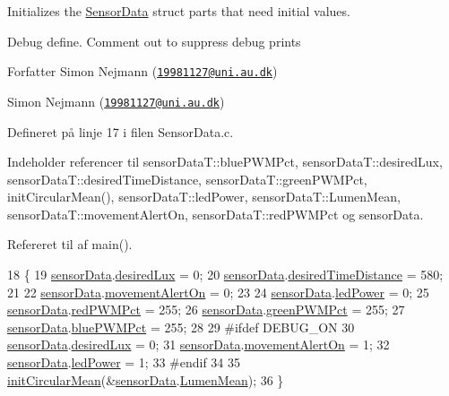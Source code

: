 Initializes the \hyperlink{class_sensor_data}{Sensor\+Data} struct parts that need initial values. 

Debug define. Comment out to suppress debug prints

\begin{DoxyAuthor}{Forfatter}
Simon Nejmann (\href{mailto:19981127@uni.au.dk}{\tt 19981127@uni.\+au.\+dk})

Simon Nejmann (\href{mailto:19981127@uni.au.dk}{\tt 19981127@uni.\+au.\+dk}) 
\end{DoxyAuthor}


Defineret på linje 17 i filen Sensor\+Data.\+c.



Indeholder referencer til sensor\+Data\+T\+::blue\+P\+W\+M\+Pct, sensor\+Data\+T\+::desired\+Lux, sensor\+Data\+T\+::desired\+Time\+Distance, sensor\+Data\+T\+::green\+P\+W\+M\+Pct, init\+Circular\+Mean(), sensor\+Data\+T\+::led\+Power, sensor\+Data\+T\+::\+Lumen\+Mean, sensor\+Data\+T\+::movement\+Alert\+On, sensor\+Data\+T\+::red\+P\+W\+M\+Pct og sensor\+Data.



Refereret til af main().


\begin{DoxyCode}
18 \{
19     \hyperlink{_sensor_data_8h_a166db779eaca1ca69d6d63aa4fc36674}{sensorData}.\hyperlink{_sensor_data_8h_ad85f2cca5ef7520f1dc87fc48fc6d8e6}{desiredLux} = 0;
20     \hyperlink{_sensor_data_8h_a166db779eaca1ca69d6d63aa4fc36674}{sensorData}.\hyperlink{_sensor_data_8h_a477d7465dc8c397bdb795593df890d8b}{desiredTimeDistance} = 580;
21 
22     \hyperlink{_sensor_data_8h_a166db779eaca1ca69d6d63aa4fc36674}{sensorData}.\hyperlink{_sensor_data_8h_a722c0f415211bda0d848dd8edac4f1fe}{movementAlertOn} = 0;
23     
24     \hyperlink{_sensor_data_8h_a166db779eaca1ca69d6d63aa4fc36674}{sensorData}.\hyperlink{_sensor_data_8h_a3fc7bb7b6b9d39b2a6ae384d15fc5b9d}{ledPower} = 0;
25     \hyperlink{_sensor_data_8h_a166db779eaca1ca69d6d63aa4fc36674}{sensorData}.\hyperlink{_sensor_data_8h_a6ac22d5f267938f95b2261ffa3d5e2d2}{redPWMPct} = 255;
26     \hyperlink{_sensor_data_8h_a166db779eaca1ca69d6d63aa4fc36674}{sensorData}.\hyperlink{_sensor_data_8h_ac83b8257127d55e998596d703ff141ac}{greenPWMPct} = 255;
27     \hyperlink{_sensor_data_8h_a166db779eaca1ca69d6d63aa4fc36674}{sensorData}.\hyperlink{_sensor_data_8h_ac79167c0eef257a67503f9fbce9d377c}{bluePWMPct} = 255;
28 
29 \textcolor{preprocessor}{#ifdef DEBUG\_ON}
30     \hyperlink{_sensor_data_8h_a166db779eaca1ca69d6d63aa4fc36674}{sensorData}.\hyperlink{_sensor_data_8h_ad85f2cca5ef7520f1dc87fc48fc6d8e6}{desiredLux} = 0;
31     \hyperlink{_sensor_data_8h_a166db779eaca1ca69d6d63aa4fc36674}{sensorData}.\hyperlink{_sensor_data_8h_a722c0f415211bda0d848dd8edac4f1fe}{movementAlertOn} = 1;
32     \hyperlink{_sensor_data_8h_a166db779eaca1ca69d6d63aa4fc36674}{sensorData}.\hyperlink{_sensor_data_8h_a3fc7bb7b6b9d39b2a6ae384d15fc5b9d}{ledPower} = 1;
33 \textcolor{preprocessor}{#endif}
34     
35     \hyperlink{_circular_mean_8c_a5118b6b2a8751d4400b4ea2a0a15329a}{initCircularMean}(&\hyperlink{_sensor_data_8h_a166db779eaca1ca69d6d63aa4fc36674}{sensorData}.\hyperlink{_sensor_data_8h_a2ff5a38714ef318f86285c7d8fe4c8ea}{LumenMean});
36 \}
\end{DoxyCode}


